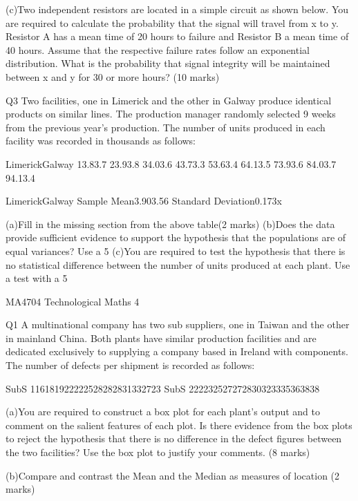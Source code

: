(c)Two independent resistors are located in a simple circuit as shown below.  You are required to calculate the probability that the signal will travel from x to y.  Resistor A has a mean time of 20 hours to failure and Resistor B a mean time of 40 hours.  Assume that the respective failure rates follow an exponential distribution.  What is the probability that signal integrity will be maintained between x and y for 30 or more hours?
(10 marks)






Q3
Two facilities, one in Limerick and the other in Galway produce identical products on similar lines.  The production manager randomly selected 9 weeks from the previous year’s production.  The number of units produced in each facility was recorded in thousands as follows:

LimerickGalway
13.83.7
23.93.8
34.03.6
43.73.3
53.63.4
64.13.5
73.93.6
84.03.7
94.13.4



LimerickGalway
Sample Mean3.903.56
Standard Deviation0.173x

(a)Fill in the missing section from the above table(2 marks)
(b)Does the data provide sufficient evidence to support the hypothesis that the populations are of equal variances?  Use a 5%
(c)You are required to test the hypothesis that there is no statistical difference between the number of units produced at each plant.  Use a test with a 5%




MA4704 Technological Maths 4 

Q1
A multinational company has two sub suppliers, one in Taiwan and the other in mainland China.  Both plants have similar production facilities and are dedicated exclusively to supplying a company based in Ireland with components.
The number of defects per shipment is recorded as follows:

SubS 116181922222528282831332723
SubS 222232527272830323335363838

(a)You are required to construct a box plot for each plant’s output and to comment on the salient features of each plot.  Is there evidence from the box plots to reject the hypothesis that there is no difference in the defect figures between the two facilities?  Use the box plot to justify your comments.
(8 marks)

(b)Compare and contrast the Mean and the Median as measures of location
(2 marks)

